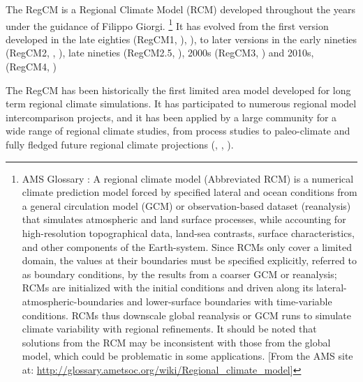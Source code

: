
The \ac{RegCM} is a Regional Climate Model (RCM) developed throughout the
years under the guidance of Filippo Giorgi.
\footnote{AMS Glossary : A regional climate model (Abbreviated RCM) is a
numerical climate prediction model forced by specified lateral and ocean
conditions from a general circulation model (GCM) or observation-based
dataset (reanalysis) that simulates atmospheric and land surface processes,
while accounting for high-resolution topographical data, land-sea contrasts,
surface characteristics, and other components of the Earth-system.
Since RCMs only cover a limited domain, the values at their boundaries
must be specified explicitly, referred to as boundary conditions, by the
results from a coarser GCM or reanalysis; RCMs are initialized with the
initial conditions and driven along its lateral-atmospheric-boundaries and
lower-surface boundaries with time-variable conditions.
RCMs thus downscale global reanalysis or GCM runs to simulate climate
variability with regional refinements. It should be noted that solutions
from the RCM may be inconsistent with those from the global model, which
could be problematic in some applications. [From the AMS site at:
\url{http://glossary.ametsoc.org/wiki/Regional_climate_model}]}
It has evolved from the first version developed in the late eighties
(\ac{RegCM}1, \cite{Dickinson_89}), \cite{Giorgi_90}), to later
versions in the early nineties (\ac{RegCM}2, \cite{Giorgi_93b},
\cite{Giorgi_93c}), late nineties (\ac{RegCM}2.5, \cite{Giorgi_99}),
2000s (\ac{RegCM}3, \cite{Pal_00}) and 2010s,
(\ac{RegCM}4, \cite{Giorgi_13})

The \ac{RegCM} has been historically the first limited area model
developed for long term regional climate simulations. It has participated to
numerous regional model intercomparison projects, and it has been applied by
a large community for a wide range of regional climate studies, from process
studies to paleo-climate and fully fledged future regional climate
projections (\cite{Giorgi_99}, \cite{Giorgi_06}, \cite{Giorgi_14}).

